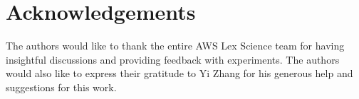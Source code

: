 \section{Acknowledgements}
The authors would like to thank the entire AWS Lex Science team for having insightful discussions and providing feedback with experiments. The authors would also like to express their gratitude to Yi Zhang for his generous help and suggestions for this work.